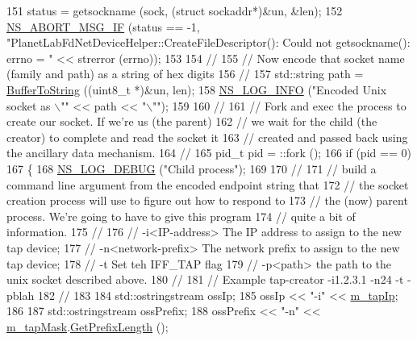 \begin{DoxyCode}
151   status = getsockname (sock, (\textcolor{keyword}{struct} sockaddr*)&un, &len);
152   \hyperlink{group__fatal_ga6653324225bc139e46deea177614ceee}{NS\_ABORT\_MSG\_IF} (status == -1, \textcolor{stringliteral}{"PlanetLabFdNetDeviceHelper::CreateFileDescriptor(): Could
       not getsockname(): errno = "} << strerror (errno));
153 
154   \textcolor{comment}{//}
155   \textcolor{comment}{// Now encode that socket name (family and path) as a string of hex digits}
156   \textcolor{comment}{//}
157   std::string path = \hyperlink{namespacens3_a97907497171f00140c77ed054e3baad6}{BufferToString} ((uint8\_t *)&un, len);
158   \hyperlink{group__logging_gafbd73ee2cf9f26b319f49086d8e860fb}{NS\_LOG\_INFO} (\textcolor{stringliteral}{"Encoded Unix socket as \(\backslash\)""} << path << \textcolor{stringliteral}{"\(\backslash\)""});
159 
160   \textcolor{comment}{//}
161   \textcolor{comment}{// Fork and exec the process to create our socket.  If we're us (the parent)}
162   \textcolor{comment}{// we wait for the child (the creator) to complete and read the socket it}
163   \textcolor{comment}{// created and passed back using the ancillary data mechanism.}
164   \textcolor{comment}{//}
165   pid\_t pid = ::fork ();
166   \textcolor{keywordflow}{if} (pid == 0)
167     \{
168       \hyperlink{group__logging_ga413f1886406d49f59a6a0a89b77b4d0a}{NS\_LOG\_DEBUG} (\textcolor{stringliteral}{"Child process"});
169 
170       \textcolor{comment}{//}
171       \textcolor{comment}{// build a command line argument from the encoded endpoint string that}
172       \textcolor{comment}{// the socket creation process will use to figure out how to respond to}
173       \textcolor{comment}{// the (now) parent process.  We're going to have to give this program}
174       \textcolor{comment}{// quite a bit of information.}
175       \textcolor{comment}{//}
176       \textcolor{comment}{// -i<IP-address> The IP address to assign to the new tap device;}
177       \textcolor{comment}{// -n<network-prefix> The network prefix to assign to the new tap device;}
178       \textcolor{comment}{// -t Set teh IFF\_TAP flag}
179       \textcolor{comment}{// -p<path> the path to the unix socket described above.}
180       \textcolor{comment}{//}
181       \textcolor{comment}{// Example tap-creator -i1.2.3.1 -n24 -t -pblah}
182       \textcolor{comment}{//}
183 
184       std::ostringstream ossIp;
185       ossIp << \textcolor{stringliteral}{"-i"} << \hyperlink{classns3_1_1PlanetLabFdNetDeviceHelper_a85f9999ccfe2efd2cf5431f09d8b6fb5}{m\_tapIp};
186 
187       std::ostringstream ossPrefix;
188       ossPrefix << \textcolor{stringliteral}{"-n"} << \hyperlink{classns3_1_1PlanetLabFdNetDeviceHelper_a809572f0a890702c0e9843c44bf76fa0}{m\_tapMask}.\hyperlink{classns3_1_1Ipv4Mask_aed6cdc1658a130595f4acf33e33fcebe}{GetPrefixLength} ();

\end{DoxyCode}
